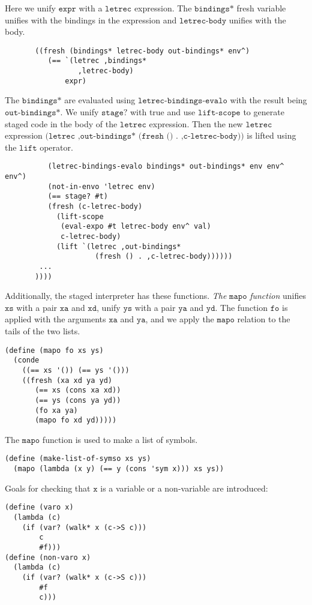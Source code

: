 \documentclass[11pt]{article}
\theoremstyle{definition}
\newcommand{\code}[1]{\texttt{#1}}
\newcommand\tab[1][1cm]{\hspace*{#1}}
\begin{document}
\tab Here we unify $\code{expr}$ with a $\code{letrec}$ expression. The $\code{bindings*}$ fresh variable unifies with the bindings in the expression and $\code{letrec-body}$ unifies with the body.
\begin{lstlisting}       
       ((fresh (bindings* letrec-body out-bindings* env^)
          (== `(letrec ,bindings*
                 ,letrec-body)
              expr)
\end{lstlisting}
\tab The $\code{bindings*}$ are evaluated using $\code{letrec-bindings-evalo}$ with the result being $\code{out-bindings*}$. We unify $\code{stage?}$ with true and use $\code{lift-scope}$ to generate staged code in the body of the $\code{letrec}$ expression. Then the new $\code{letrec}$ expression $\code{(letrec ,out-bindings* (fresh () . ,c-letrec-body))}$ is lifted using the $\code{lift}$ operator.
\begin{lstlisting}
          (letrec-bindings-evalo bindings* out-bindings* env env^ env^)
          (not-in-envo 'letrec env)
          (== stage? #t)
          (fresh (c-letrec-body)
            (lift-scope
             (eval-expo #t letrec-body env^ val)
             c-letrec-body)
            (lift `(letrec ,out-bindings*
                     (fresh () . ,c-letrec-body))))))
        ...
       ))))
\end{lstlisting}
\tab Additionally, the staged interpreter has these functions.\newline 
\tab \textit{The} $\code{mapo}$ \textit{function} unifies $\code{xs}$ with a pair $\code{xa}$ and $\code{xd}$, unify $\code{ys}$ with a pair $\code{ya}$ and $\code{yd}$. The function  $\code{fo}$ is applied with the arguments $\code{xa}$ and $\code{ya}$, and we apply the $\code{mapo}$ relation to the tails of the two lists.
\begin{lstlisting}[]
(define (mapo fo xs ys)
  (conde
    ((== xs '()) (== ys '()))
    ((fresh (xa xd ya yd)
       (== xs (cons xa xd))
       (== ys (cons ya yd))
       (fo xa ya)
       (mapo fo xd yd)))))
\end{lstlisting}
\tab The $\code{mapo}$ function is used to make a list of symbols. 
\begin{lstlisting}
(define (make-list-of-symso xs ys)
  (mapo (lambda (x y) (== y (cons 'sym x))) xs ys))
\end{lstlisting}
\tab Goals for checking that $\code{x}$ is a variable or a non-variable are introduced:
\begin{lstlisting}[]
(define (varo x)
  (lambda (c)
    (if (var? (walk* x (c->S c)))
        c
        #f)))
(define (non-varo x)
  (lambda (c)
    (if (var? (walk* x (c->S c)))
        #f
        c)))
\end{lstlisting}
\end{document}
